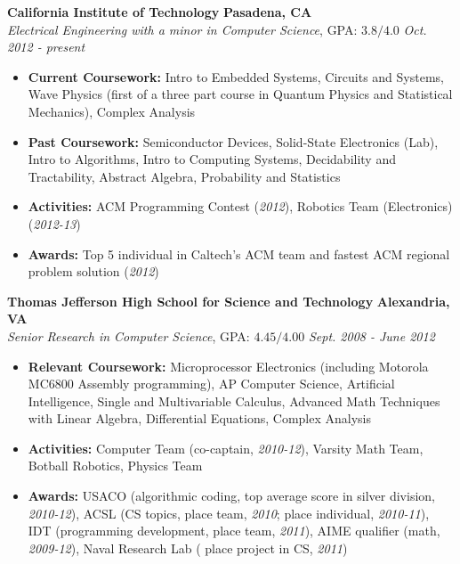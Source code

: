 \documentclass{article}
\newenvironment{changemargin}[2]{%
  \begin{list}{}{%
    \setlength{\topsep}{0pt}%
    \setlength{\leftmargin}{#1}%
    \setlength{\rightmargin}{#2}%
    \setlength{\listparindent}{\parindent}%
    \setlength{\itemindent}{\parindent}%
    \setlength{\parsep}{\parskip}%
  }%
  \item[]}{\end{list}
}
\newenvironment{body} {
	\vspace*{-16pt}
	\begin{changemargin}{-0.25in}{-0.5in}
  }	
	{\end{changemargin}
}
\begin{document}
\begin{body}
	\vspace{14pt}
	\textbf{California Institute of Technology} \hfill \textbf{Pasadena, CA}{} \\
	\emph{Electrical Engineering with a minor in Computer Science}, GPA: $3.8/4.0$ \hfill \emph{Oct. 2012 - present} \\
	\begin{itemize}
	\item \textbf{Current Coursework:} Intro to Embedded Systems, Circuits and Systems, Wave Physics (first of a three part course in Quantum Physics and Statistical Mechanics), Complex Analysis
	\item \textbf{Past Coursework:} Semiconductor Devices, Solid-State Electronics (Lab), Intro to Algorithms, Intro to Computing Systems, Decidability and Tractability, Abstract Algebra, Probability and Statistics
	\item \textbf{Activities:} ACM Programming Contest (\textit{2012}), Robotics Team (Electronics) (\textit{2012-13})
	\item \textbf{Awards:} Top 5 individual in Caltech's ACM team and fastest ACM regional problem solution (\textit{2012})
	\end{itemize}

	\medskip

	\textbf{Thomas Jefferson High School for Science and Technology} \hfill \textbf{Alexandria, VA} \\
	\emph{Senior Research in Computer Science}, GPA: $4.45/4.00$ \hfill \emph{Sept. 2008 - June 2012} \\
	\begin{itemize}
	\item \textbf{Relevant Coursework:} Microprocessor Electronics (including Motorola MC6800 Assembly programming), AP Computer Science, Artificial Intelligence, Single and Multivariable Calculus, Advanced Math Techniques with Linear Algebra, Differential Equations, Complex Analysis
	\item \textbf{Activities:} Computer Team (co-captain, \textit{2010-12}), Varsity Math Team, Botball Robotics, Physics Team
	\item \textbf{Awards:} USACO (algorithmic coding, top average score in silver division, \textit{2010-12}), ACSL (CS topics,  place team, \textit{2010};  place individual, \textit{2010-11}), IDT (programming development,  place team, \textit{2011}), AIME qualifier (math, \textit{2009-12}), Naval Research Lab ( place project in CS, \textit{2011})
	\end{itemize}
\end{body}
\end{document}
